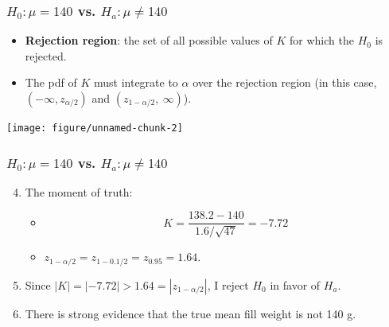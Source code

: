 \documentclass[handout]{beamer}\usepackage{graphicx, color}
\newenvironment{knitrout}{}{} %
\numberwithin{equation}{section}
\begin{document}
\begin{frame}[fragile]
\frametitle{ $H_0: \mu = 140$ vs. $H_a: \mu \ne 140$} \small
\begin{itemize}
\item {\bf Rejection region}: the set of all possible values of $K$ for which the $H_0$ is rejected.
\pause \item The pdf of $K$ must integrate to $\alpha$ over the rejection region (in this case, $(-\infty, z_{\alpha/2})$ and $(z_{1-\alpha/2}, \ \infty)$).
\end{itemize}
\pause \begin{center}
\begin{knitrout}
\color{fgcolor}
\texttt{[image: figure/unnamed-chunk-2]} 

\end{knitrout}

\end{center}
\end{frame}

\begin{frame}
\frametitle{ $H_0: \mu = 140$ vs. $H_a: \mu \ne 140$} \small
\begin{enumerate}
\setcounter{enumi}{3}
\item The moment of truth:
\begin{itemize}
\pause \item \[K = \frac{138.2 - 140}{1.6/\sqrt{47}} = -7.72\]
\pause \item $z_{1-\alpha/2} = z_{1-0.1/2} = z_{0.95} = 1.64$.
\end{itemize}
\pause \item Since $|K| = |-7.72| > 1.64 = |z_{1 - \alpha/2}|$, I reject $H_0$ in favor of $H_a$.
\pause \item There is strong evidence that the true mean fill weight is not 140 g.
\end{enumerate}
\end{frame}
\end{document}
